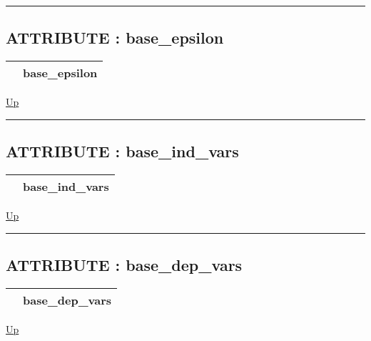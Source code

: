 \par


\rule{\textwidth}{0.4pt}
\subsection*{ATTRIBUTE : base\_epsilon}
\hypertarget{ecldoc:logisticregression.constants.base_epsilon}{}

{\renewcommand{\arraystretch}{1.5}
\begin{tabularx}{\textwidth}{|>{\raggedright\arraybackslash}l|X|}
\hline
\hspace{0pt} & base\_epsilon \\
\hline
\end{tabularx}
}

\hyperlink{ecldoc:LogisticRegression.Constants}{Up}

\par


\rule{\textwidth}{0.4pt}
\subsection*{ATTRIBUTE : base\_ind\_vars}
\hypertarget{ecldoc:logisticregression.constants.base_ind_vars}{}

{\renewcommand{\arraystretch}{1.5}
\begin{tabularx}{\textwidth}{|>{\raggedright\arraybackslash}l|X|}
\hline
\hspace{0pt} & base\_ind\_vars \\
\hline
\end{tabularx}
}

\hyperlink{ecldoc:LogisticRegression.Constants}{Up}

\par


\rule{\textwidth}{0.4pt}
\subsection*{ATTRIBUTE : base\_dep\_vars}
\hypertarget{ecldoc:logisticregression.constants.base_dep_vars}{}

{\renewcommand{\arraystretch}{1.5}
\begin{tabularx}{\textwidth}{|>{\raggedright\arraybackslash}l|X|}
\hline
\hspace{0pt} & base\_dep\_vars \\
\hline
\end{tabularx}
}

\hyperlink{ecldoc:LogisticRegression.Constants}{Up}

